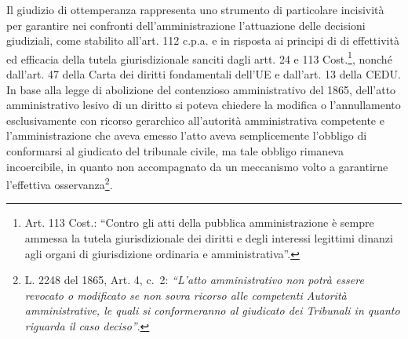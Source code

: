 \documentclass[12pt,it,a4paper,]{report}
\begin{document}
Il giudizio di ottemperanza rappresenta uno strumento di particolare
incisività per garantire nei confronti dell'amministrazione l'attuazione
delle decisioni giudiziali, come stabilito all'art. 112 c.p.a. e in
risposta ai principi di di effettività ed efficacia della tutela
giurisdizionale sanciti dagli artt. 24 e 113 Cost.\footnote{Art. 113
  Cost.: ``Contro gli atti della pubblica amministrazione è sempre
  ammessa la tutela giurisdizionale dei diritti e degli interessi
  legittimi dinanzi agli organi di giurisdizione ordinaria e
  amministrativa''.}, nonché dall'art. 47 della Carta dei diritti
fondamentali dell'UE e dall'art. 13 della CEDU. In base alla legge di
abolizione del contenzioso amministrativo del 1865, dell'atto
amministrativo lesivo di un diritto si poteva chiedere la modifica o
l'annullamento esclusivamente con ricorso gerarchico all'autorità
amministrativa competente e l'amministrazione che aveva emesso l'atto
aveva semplicemente l'obbligo di conformarsi al giudicato del tribunale
civile, ma tale obbligo rimaneva incoercibile, in quanto non
accompagnato da un meccanismo volto a garantirne l'effettiva
osservanza\footnote{L. 2248 del 1865, Art. 4, c.~2: \emph{``L'atto
  amministrativo non potrà essere revocato o modificato se non sovra
  ricorso alle competenti Autorità amministrative, le quali si
  conformeranno al giudicato dei Tribunali in quanto riguarda il caso
  deciso''}.}.
\end{document}
